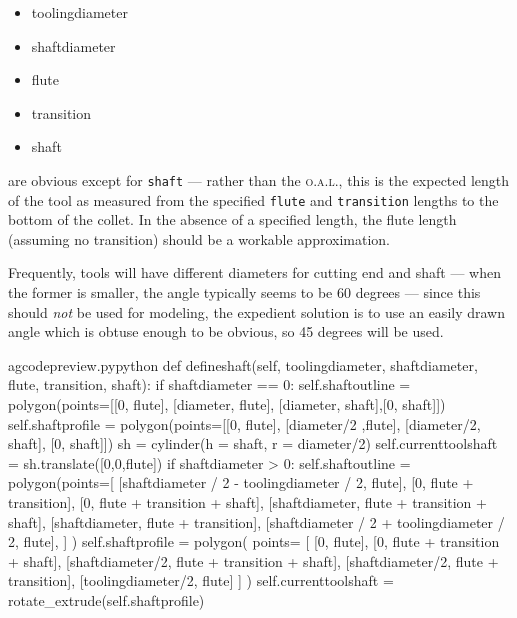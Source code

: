 \documentclass{ltxdoc}
\begin{document}
\begin{itemize}
\item toolingdiameter
\item shaftdiameter
\item flute
\item transition
\item shaft
\end{itemize}

\noindent are obvious except for \verb|shaft| --- rather than the \textsc{o.a.l.}, this is the expected length of the tool as measured from the specified \verb|flute| and \verb|transition| lengths to the bottom of the collet. In the absence of a specified length, the flute length (assuming no transition) should be a workable approximation. 


Frequently, tools will have different diameters for cutting end and shaft --- when the former is smaller, the angle typically seems to be 60 degrees --- since this should \emph{not} be used for modeling, the expedient solution is to use an easily drawn angle which is obtuse enough to be obvious, so 45 degrees will be used.

\lstset{firstnumber=\thegcpy}
\begin{writecode}{a}{gcodepreview.py}{python}
    def defineshaft(self, toolingdiameter, shaftdiameter, flute, transition, shaft):
        if shaftdiameter == 0:
            self.shaftoutline = polygon(points=[[0, flute], [diameter, flute], [diameter, shaft],[0, shaft]])
            self.shaftprofile = polygon(points=[[0, flute], [diameter/2 ,flute], [diameter/2, shaft], [0, shaft]])
            sh = cylinder(h = shaft, r = diameter/2)
            self.currenttoolshaft = sh.translate([0,0,flute])
        if shaftdiameter > 0:
            self.shaftoutline = polygon(points=[
                [shaftdiameter / 2 - toolingdiameter / 2, flute],
                [0, flute + transition],
                [0, flute + transition + shaft],
                [shaftdiameter, flute + transition + shaft],
                [shaftdiameter, flute + transition],
                [shaftdiameter / 2 + toolingdiameter / 2, flute],
                ] )
            self.shaftprofile = polygon( points= [
                [0, flute], 
                [0, flute + transition + shaft],
                [shaftdiameter/2, flute + transition + shaft],
                [shaftdiameter/2, flute + transition],
                [toolingdiameter/2, flute]
                ] )
            self.currenttoolshaft = rotate_extrude(self.shaftprofile)

\end{writecode}
\addtocounter{gcpy}{24}
\end{document}
